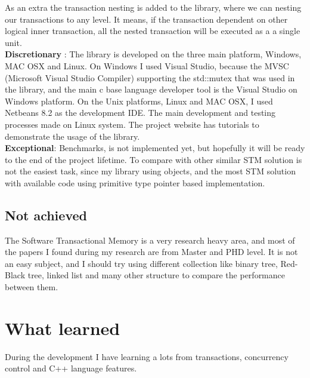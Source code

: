 \documentclass[12pt]{article}
\begin{document}
As an extra the transaction nesting is added to the library, where we can nesting our transactions to any level. It means, if the transaction dependent on other logical inner transaction, all the nested transaction will be executed as a a single unit.\\

\textbf{Discretionary} : The library is developed on the three main platform, Windows, MAC OSX and Linux. On Windows I used Visual Studio, because the MVSC (Microsoft Visual Studio Compiler) supporting the std::mutex that was used in the library, and the main c base language developer tool is the Visual Studio on Windows platform. On the Unix platforms, Linux and MAC OSX, I used Netbeans 8.2 as the development IDE. The main development and testing processes made on Linux system. The project website has tutorials to demonstrate the usage of the library.\\

\textbf{Exceptional}: Benchmarks, is not implemented yet, but hopefully it will be ready to the end of the project lifetime. To compare with other similar STM solution is not the easiest task, since my library using objects, and the most STM solution with available code using primitive type pointer based implementation. 

\subsection{Not achieved}
The Software Transactional Memory is a very research heavy area, and most of the papers I found during my research are from Master and PHD level. It is not an easy subject, and I should try using different collection like binary tree, Red-Black tree, linked list and many other structure to compare the performance between them.\\


\newpage
\section{What learned}
During the development I have learning a lots from transactions, concurrency control and C++ language features.
\end{document}
